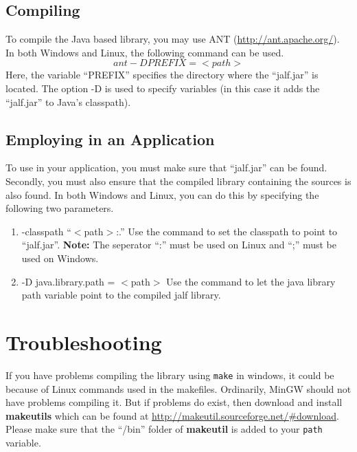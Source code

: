 \subsection*{Compiling \libalf}
To compile the Java based \libalf library, you may use ANT (\url{http://ant.apache.org/}). \vskip 1pt
In both Windows and Linux, the following command can be used.
\[
  ant -D PREFIX=<path>
\]
Here, the variable ``PREFIX'' specifies the directory where the ``jalf.jar'' is located. The option -D is used to specify variables (in this case it adds the ``jalf.jar'' to Java's classpath). \vskip 1pt

\subsection*{Employing \jalf in an Application}
To use \libalf in your application, you must make sure that ``jalf.jar'' can be found. Secondly, you must also ensure that the compiled \jalf library containing the \libalf sources is also found.  \vskip 1pt
In both Windows and Linux, you can do this by specifying the following two parameters.
\begin{enumerate}
 \item -classpath ``$<$path$>$:.'' \vskip 1pt
	Use the command to set the classpath to point to ``jalf.jar''. \vskip 1pt
	\textbf{Note:} The seperator ``:'' must be used on Linux and ``;'' must be used on Windows.
 \item -D java.library.path = $<$path$>$ \vskip 1pt
	Use the command to let the java library path variable point to the compiled jalf library. 
\end{enumerate}

\section{Troubleshooting}
If you have problems compiling the library using \texttt{make} in windows, it could be because of Linux commands used in the makefiles. Ordinarily, MinGW should not have problems compiling it. But if problems do exist, then download and install \textbf{makeutils} which can be found at \url{http://makeutil.sourceforge.net/#download}. \vskip 1pt
Please make sure that the ``/bin'' folder of \textbf{makeutil} is added to your \texttt{path} variable. 

